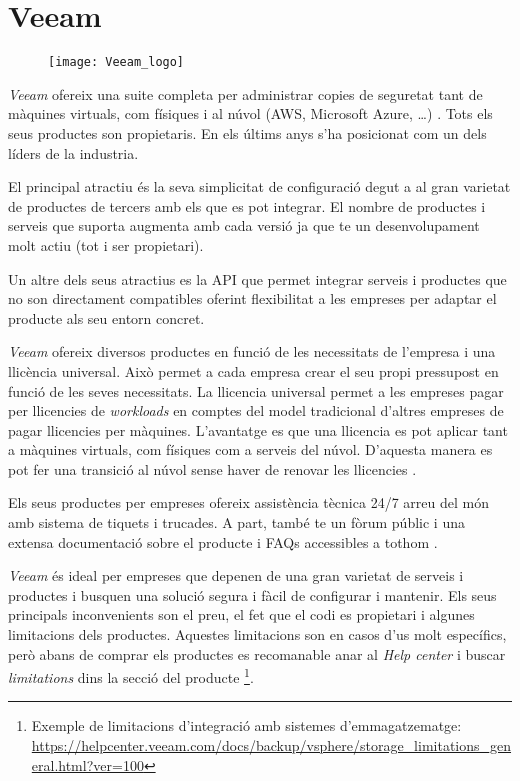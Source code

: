 
\section{Veeam}%
\label{sec:veeam}

\begin{figure}[H]
    \centering
    \texttt{[image: Veeam\_logo]}
\end{figure}

\emph{Veeam} ofereix una suite completa per administrar copies de seguretat
tant de màquines virtuals, com físiques i al núvol (AWS, Microsoft Azure,
\dots) \cite{noauthor_veeam_2020}. Tots els seus productes son propietaris. En
els últims anys s'ha posicionat com un dels líders de la industria.

El principal atractiu és la seva simplicitat de configuració degut a al gran
varietat de productes de tercers amb els que es pot integrar. El nombre de
productes i serveis que suporta augmenta amb cada versió ja que te un
desenvolupament molt actiu (tot i ser propietari).

Un altre dels seus atractius es la API que permet integrar serveis i productes
que no son directament compatibles oferint flexibilitat a les empreses per
adaptar el producte als seu entorn concret.

\emph{Veeam} ofereix diversos productes en funció de les necessitats de
l'empresa i una llicència universal. Això permet a cada empresa crear el seu
propi pressupost en funció de les seves necessitats. La llicencia universal
permet a les empreses pagar per llicencies de \emph{workloads} en comptes del
model tradicional d'altres empreses de pagar llicencies per màquines.
L'avantatge es que una llicencia es pot aplicar tant a màquines virtuals, com
físiques com a serveis del núvol. D'aquesta manera es pot fer una transició al
núvol sense haver de renovar les llicencies \cite{noauthor_veeam_nodate-1}.

Els seus productes per empreses ofereix assistència tècnica 24/7 arreu del món
amb sistema de tiquets i trucades. A part, també te un fòrum públic i una
extensa documentació sobre el producte i FAQs accessibles a tothom
\cite{noauthor_veeam_nodate-2}.

\emph{Veeam} és ideal per empreses que depenen de una gran varietat de serveis i
productes i busquen una solució segura i fàcil de configurar i mantenir. Els
seus principals inconvenients son el preu, el fet que el codi es propietari
i algunes limitacions dels productes.  Aquestes limitacions son en casos d'us
molt específics, però abans de comprar els productes es recomanable anar al
\emph{Help center} i buscar \emph{limitations} dins la secció del producte
\footnote{Exemple de limitacions d'integració amb sistemes d'emmagatzematge:
\url{https://helpcenter.veeam.com/docs/backup/vsphere/storage_limitations_general.html?ver=100}}.
